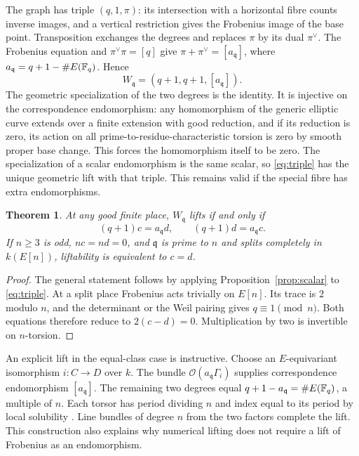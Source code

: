 \documentclass[11pt]{article}
\newtheorem{pictheorem}[picproposition]{Theorem}
\begin{document}
The graph has triple $(q,1,\pi)$: its intersection with a horizontal
fibre counts inverse images, and a vertical restriction gives the
Frobenius image of the base point. Transposition exchanges the degrees
and replaces $\pi$ by its dual $\pi^\vee$. The Frobenius equation and
$\pi^\vee\pi=[q]$ give $\pi+\pi^\vee=[a_{\mathfrak q}]$, where
$a_{\mathfrak q}=q+1-\#E(\mathbb F_q)$. Hence
\begin{equation}\label{eq:triple}
             W_{\mathfrak q}=(q+1,q+1,[a_{\mathfrak q}]).
\end{equation}
The geometric specialization of the two degrees is the identity.
It is injective on the correspondence endomorphism: any homomorphism
of the generic elliptic curve extends over a finite extension with
good reduction, and if its reduction is zero, its action on all
prime-to-residue-characteristic torsion is zero by smooth proper base
change. This forces the homomorphism itself to be zero. The specialization
of a scalar endomorphism is the same scalar, so \eqref{eq:triple} has
the unique geometric lift with that triple. This remains valid if
the special fibre has extra endomorphisms.

\begin{pictheorem}\label{th:criterion}
At any good finite place, $W_{\mathfrak q}$ lifts if and only if
\[
        (q+1)c=a_{\mathfrak q}d,\qquad
        (q+1)d=a_{\mathfrak q}c .
\]
If $n\ge3$ is odd, $nc=nd=0$, and $\mathfrak q$ is prime to $n$ and
splits completely in $k(E[n])$, liftability is equivalent to $c=d$.
\end{pictheorem}

\begin{proof}
The general statement follows by applying Proposition~\ref{prop:scalar}
to \eqref{eq:triple}. At a split place Frobenius acts trivially on
$E[n]$. Its trace is $2$ modulo $n$, and the determinant or the Weil
pairing gives $q\equiv1\pmod n$. Both equations therefore reduce
to $2(c-d)=0$. Multiplication by two is invertible on $n$-torsion.
\end{proof}

An explicit lift in the equal-class case is instructive. Choose an
$E$-equivariant isomorphism $i:C\to D$ over $k$. The bundle
$\mathcal O(a_{\mathfrak q}\Gamma_i)$ supplies correspondence
endomorphism $[a_{\mathfrak q}]$. The remaining two degrees equal
$q+1-a_{\mathfrak q}=\#E(\mathbb F_q)$, a multiple of $n$. Each torsor has
period dividing $n$ and index equal to its period by local solubility
\cite[Thm.~2.7(ii)]{FisherVisibility}. Line bundles of degree $n$ from the two
factors complete the lift. This construction also explains why numerical
lifting does not require a lift of Frobenius as an endomorphism.
\end{document}
